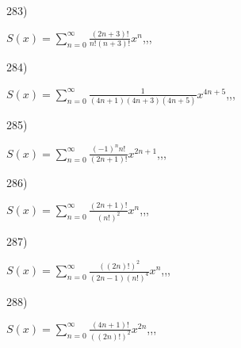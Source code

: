 \documentclass[11pt, ukrainian]{article}
\begin{document}
\par
\vspace{0.9cm}
283) \space 
{%
{$S(x)=\sum\limits_{n=0}^{\infty}{\frac{(2n+3)!}{n!(n+3)!}}{x^{n}}$},,, \par \smallskip  
}
\par
\vspace{0.9cm}
284) \space 
{%
{$S(x)=\sum\limits_{n=0}^{\infty}{\frac{1}{(4n+1)(4n+3)(4n+5)}}{x^{{4n+5}}}$},,, \par \smallskip  
}
\par
\vspace{0.9cm}
285) \space 
{%
{$S(x)=\sum\limits_{n=0}^{\infty}{\frac{{(-1)^n}{n!}}{(2n+1)!}}{x^{{2n+1}}}$},,, \par \smallskip  
}
\par
\vspace{0.9cm}
286) \space 
{%
{$S(x)=\sum\limits_{n=0}^{\infty}{\frac{(2n+1)!}{(n!)^2}}{x^{n}}$},,, \par \smallskip  
}
\par
\vspace{0.9cm}
287) \space 
{%
{$S(x)=\sum\limits_{n=0}^{\infty}{\frac{((2n)!)^2}{(2n-1)(n!)^4}}{x^{{n}}}$},,, \par \smallskip  
}
\par
\vspace{0.9cm}
288) \space 
{%
{$S(x)=\sum\limits_{n=0}^{\infty}{\frac{(4n+1)!}{((2n)!)^2}}{x^{{2n}}}$},,, \par \smallskip  
}
\end{document}
